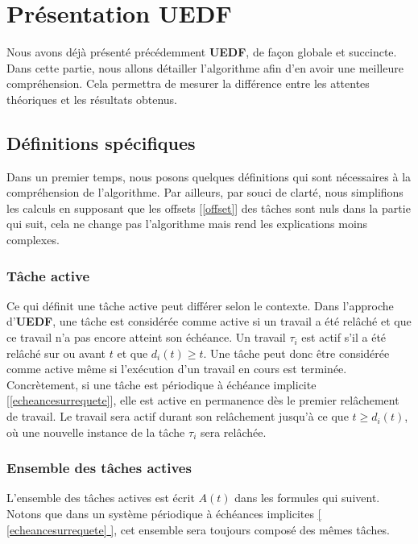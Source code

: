 	
	\section{Présentation UEDF}
	
	Nous avons déjà présenté précédemment \textbf{UEDF}, de façon globale et succincte. 
	Dans cette partie, nous allons détailler l'algorithme afin d'en avoir une meilleure compréhension. Cela 
	permettra de mesurer la différence entre les attentes théoriques et les résultats obtenus.\newline
	
	
	\subsection{Définitions spécifiques}
	Dans un premier temps, nous posons quelques définitions qui sont nécessaires à la compréhension de l'algorithme. 
	Par ailleurs, par souci de clarté, nous simplifions les calculs en supposant que les offsets [\ref*{offset}] des tâches 
	sont nuls dans la partie qui suit, cela ne change pas l'algorithme mais rend les explications moins 
	complexes.
	
	\subsubsection{Tâche active}\label{tacheactive}
	Ce qui définit une tâche \og{}active\fg{} peut différer selon le contexte. Dans l'approche d'\textbf{UEDF}, une tâche est 
	considérée comme active si un travail a été relâché et que ce travail n'a pas encore atteint son échéance. 
	Un travail $\tau_i$ est actif s'il a été relâché sur ou avant $t$ et que $d_i(t) \geq t$.
	Une tâche peut donc 
	être considérée comme active même si l'exécution d'un travail en cours est terminée. 
	Concrètement, si une tâche est périodique à échéance implicite [\hyperref[echeancesurrequete]{\ref*{echeancesurrequete}}], elle est active en permanence dès le 
	premier relâchement de travail. Le travail sera actif durant son relâchement jusqu'à ce que $t \geq d_i(t)$, où 
	une nouvelle instance de la tâche $\tau_i$ sera relâchée.
	
	
	\subsubsection{Ensemble des tâches actives}\label{ensembledestachesactives}
	L'ensemble des tâches actives est écrit $A(t)$ dans les formules qui suivent. Notons que dans un système 
	périodique à échéances implicites \hyperref[echeancesurrequete]{[ \ref*{echeancesurrequete} ]}, cet ensemble 
	sera toujours composé des mêmes tâches.\newline
		
